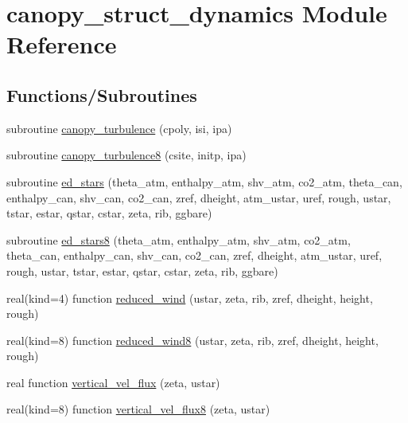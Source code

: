 \hypertarget{namespacecanopy__struct__dynamics}{}\section{canopy\+\_\+struct\+\_\+dynamics Module Reference}
\label{namespacecanopy__struct__dynamics}
\subsection*{Functions/\+Subroutines}
\begin{DoxyCompactItemize}
\item 
subroutine \hyperlink{namespacecanopy__struct__dynamics_ac7eef4d24c3e07ccb461d418e32d466e}{canopy\+\_\+turbulence} (cpoly, isi, ipa)
\item 
subroutine \hyperlink{namespacecanopy__struct__dynamics_ab65e289b4069536fa3342bc3034db824}{canopy\+\_\+turbulence8} (csite, initp, ipa)
\item 
subroutine \hyperlink{namespacecanopy__struct__dynamics_a2418e416a98f5c0dec59aeb173f92f75}{ed\+\_\+stars} (theta\+\_\+atm, enthalpy\+\_\+atm, shv\+\_\+atm, co2\+\_\+atm, theta\+\_\+can, enthalpy\+\_\+can, shv\+\_\+can, co2\+\_\+can, zref, dheight, atm\+\_\+ustar, uref, rough, ustar, tstar, estar, qstar, cstar, zeta, rib, ggbare)
\item 
subroutine \hyperlink{namespacecanopy__struct__dynamics_ae0835c779480eba52b24d54c83b952cb}{ed\+\_\+stars8} (theta\+\_\+atm, enthalpy\+\_\+atm, shv\+\_\+atm, co2\+\_\+atm, theta\+\_\+can, enthalpy\+\_\+can, shv\+\_\+can, co2\+\_\+can, zref, dheight, atm\+\_\+ustar, uref, rough, ustar, tstar, estar, qstar, cstar, zeta, rib, ggbare)
\item 
real(kind=4) function \hyperlink{namespacecanopy__struct__dynamics_ae5504447c798d15053109bc4f8ff9346}{reduced\+\_\+wind} (ustar, zeta, rib, zref, dheight, height, rough)
\item 
real(kind=8) function \hyperlink{namespacecanopy__struct__dynamics_a4bfef6570fcebda5f22600fd0660ee0c}{reduced\+\_\+wind8} (ustar, zeta, rib, zref, dheight, height, rough)
\item 
real function \hyperlink{namespacecanopy__struct__dynamics_a1453d7575881d7ee657f67e0853c51a9}{vertical\+\_\+vel\+\_\+flux} (zeta, ustar)
\item 
real(kind=8) function \hyperlink{namespacecanopy__struct__dynamics_a2d40fd080c1c03b7c112ff3861e89458}{vertical\+\_\+vel\+\_\+flux8} (zeta, ustar)
\item 

\end{DoxyCompactItemize}
